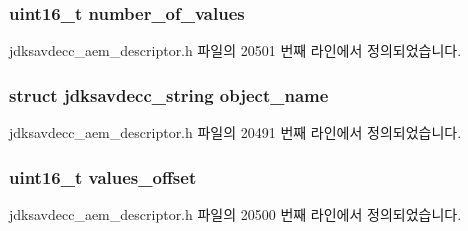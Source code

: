 \subsubsection[{\texorpdfstring{number\+\_\+of\+\_\+values}{number_of_values}}]{\setlength{\rightskip}{0pt plus 5cm}uint16\+\_\+t number\+\_\+of\+\_\+values}\hypertarget{structjdksavdecc__descriptor__matrix_a1c32421ead62b8a032c4346688cd9b69}{}\label{structjdksavdecc__descriptor__matrix_a1c32421ead62b8a032c4346688cd9b69}


jdksavdecc\+\_\+aem\+\_\+descriptor.\+h 파일의 20501 번째 라인에서 정의되었습니다.

\subsubsection[{\texorpdfstring{object\+\_\+name}{object_name}}]{\setlength{\rightskip}{0pt plus 5cm}struct {\bf jdksavdecc\+\_\+string} object\+\_\+name}\hypertarget{structjdksavdecc__descriptor__matrix_a7d1f5945a13863b1762fc6db74fa8f80}{}\label{structjdksavdecc__descriptor__matrix_a7d1f5945a13863b1762fc6db74fa8f80}


jdksavdecc\+\_\+aem\+\_\+descriptor.\+h 파일의 20491 번째 라인에서 정의되었습니다.

\subsubsection[{\texorpdfstring{values\+\_\+offset}{values_offset}}]{\setlength{\rightskip}{0pt plus 5cm}uint16\+\_\+t values\+\_\+offset}\hypertarget{structjdksavdecc__descriptor__matrix_a2987071ee0b81f35817e48a0dc92ad76}{}\label{structjdksavdecc__descriptor__matrix_a2987071ee0b81f35817e48a0dc92ad76}


jdksavdecc\+\_\+aem\+\_\+descriptor.\+h 파일의 20500 번째 라인에서 정의되었습니다.

